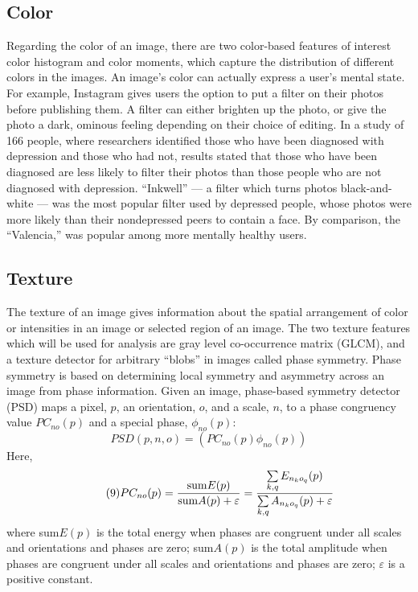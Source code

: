 \documentclass[11pt,technote,twocolumn]{IEEEtran}
\begin{document}
\subsection{Color}
Regarding the color of an image, there are two color-based features of interest color histogram and color moments, which capture the distribution of different colors in the images.\cite{5202725} An image's color can actually express a user's mental state. For example, Instagram gives users the option to put a filter on their photos before publishing them. A filter can either brighten up the photo, or give the photo a dark, ominous feeling depending on their choice of editing. In a study of 166 people, where researchers identified those who have been diagnosed with depression and those who had not, results stated that those who have been diagnosed are less likely to filter their photos than those people who are not diagnosed with depression. ``Inkwell” — a filter which turns photos black-and-white — was the most popular filter used by depressed people, whose photos were more likely than their nondepressed peers to contain a face. By comparison, the ``Valencia,” was popular among more mentally healthy users.\cite{de2013predicting}
\subsection{Texture}
The texture of an image gives information about the spatial arrangement of color or intensities in an image or selected region of an image. The two texture features which will be used for analysis are gray level co-occurrence matrix (GLCM), and a texture detector for arbitrary ``blobs” in images called phase symmetry.\cite{6879475} Phase symmetry is based on determining local symmetry and asymmetry across an image from phase information. Given an image, phase-based symmetry detector (PSD) maps a pixel, $p$, an orientation, $o$, and a scale, $n$, to a phase congruency value $PC_{no}(p)$ and a special phase, $\phi_{no}(p)$:
\begin{equation}\tag{8}
    PSD(p,n,o)=(PC_{no}(p)\phi_{no}(p))
\end{equation}
Here,
\begin{equation}\tag{9}
    PC_{no}(p)={{\rm sum} E(p)\over {\rm sum}A(p)+\varepsilon}={\sum\limits_{k,q}E_{n_{k}o_{q}}(p)\over \sum\limits_{k,q}A_{n_{k}o_{q}}(p)+\varepsilon}
\end{equation}
where sum$E(p)$ is the total energy when phases are congruent under all scales and orientations and phases are zero; sum$A(p)$ is the total amplitude when phases are congruent under all scales and orientations and phases are zero; $\varepsilon$ is a positive constant.\cite{5202725}
\end{document}
